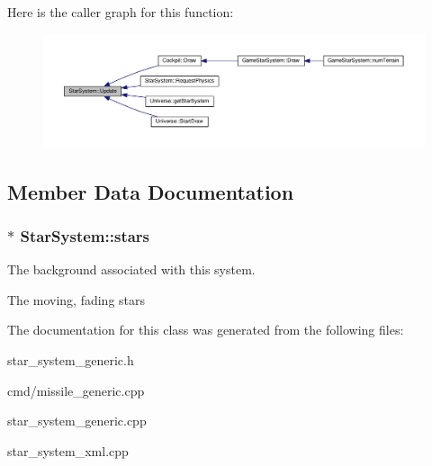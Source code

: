 Here is the caller graph for this function\+:
\nopagebreak
\begin{figure}[H]
\begin{center}
\leavevmode
\includegraphics[width=350pt]{da/dea/classStarSystem_a761562b9400fa14e0442557eb5d6e64e_icgraph}
\end{center}
\end{figure}




\subsection{Member Data Documentation}
\subsubsection[{\texorpdfstring{stars}{stars}}]{$\ast$ Star\+System\+::stars\hspace{0.3cm}{\ttfamily [protected]}}\hypertarget{classStarSystem_aa7f7e879d3c0c788bf1a2ac0fc7c8e03}{}\label{classStarSystem_aa7f7e879d3c0c788bf1a2ac0fc7c8e03}


The background associated with this system. 

The moving, fading stars 

The documentation for this class was generated from the following files\+:\begin{DoxyCompactItemize}
\item 
star\+\_\+system\+\_\+generic.\+h\item 
cmd/missile\+\_\+generic.\+cpp\item 
star\+\_\+system\+\_\+generic.\+cpp\item 
star\+\_\+system\+\_\+xml.\+cpp\end{DoxyCompactItemize}
